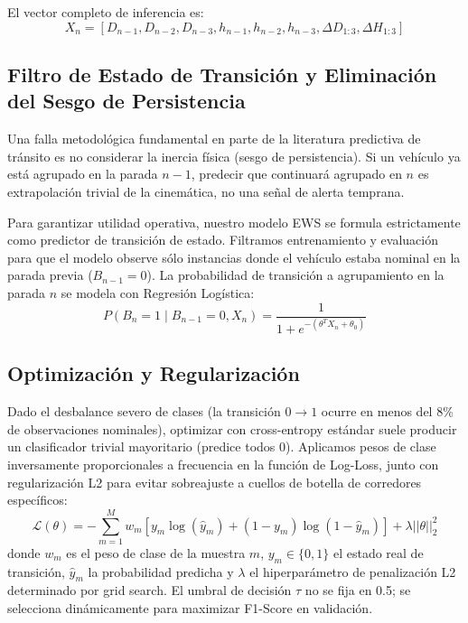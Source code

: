 \documentclass[journal,twocolumn]{IEEEtran}
\begin{document}
El vector completo de inferencia es:
\begin{equation}
	X_n = \left[ D_{n-1}, D_{n-2}, D_{n-3}, h_{n-1}, h_{n-2}, h_{n-3}, \Delta D_{1:3}, \Delta H_{1:3} \right]
\end{equation}

\subsection{Filtro de Estado de Transición y Eliminación del Sesgo de Persistencia}
Una falla metodológica fundamental en parte de la literatura predictiva de tránsito es no considerar la inercia física (sesgo de persistencia). Si un vehículo ya está agrupado en la parada $n-1$, predecir que continuará agrupado en $n$ es extrapolación trivial de la cinemática, no una señal de alerta temprana.

Para garantizar utilidad operativa, nuestro modelo EWS se formula estrictamente como predictor de transición de estado. Filtramos entrenamiento y evaluación para que el modelo observe sólo instancias donde el vehículo estaba nominal en la parada previa ($B_{n-1}=0$). La probabilidad de transición a agrupamiento en la parada $n$ se modela con Regresión Logística:
\begin{equation}
	P(B_n=1 \mid B_{n-1}=0, X_n) = \frac{1}{1 + e^{-(\theta^T X_n + \theta_0)}}
\end{equation}

\subsection{Optimización y Regularización}
Dado el desbalance severo de clases (la transición $0 \rightarrow 1$ ocurre en menos del 8\% de observaciones nominales), optimizar con cross-entropy estándar suele producir un clasificador trivial mayoritario (predice todos 0). Aplicamos pesos de clase inversamente proporcionales a frecuencia en la función de Log-Loss, junto con regularización L2 para evitar sobreajuste a cuellos de botella de corredores específicos:
\begin{equation}
	\mathcal{L}(\theta) = - \sum_{m=1}^{M} w_m \left[ y_m \log(\hat{y}_m) + (1-y_m)\log(1-\hat{y}_m) \right] + \lambda ||\theta||_2^2
\end{equation}
donde $w_m$ es el peso de clase de la muestra $m$, $y_m \in \{0,1\}$ el estado real de transición, $\hat{y}_m$ la probabilidad predicha y $\lambda$ el hiperparámetro de penalización L2 determinado por grid search. El umbral de decisión $\tau$ no se fija en 0.5; se selecciona dinámicamente para maximizar F1-Score en validación.
\end{document}
